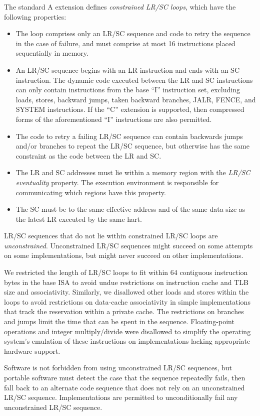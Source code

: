 The standard A extension defines {\em constrained LR/SC loops}, which have
the following properties:
\vspace{-0.2in}
\begin{itemize}
\parskip 0pt
\itemsep 1pt
\item The loop comprises only an LR/SC sequence and code to retry the sequence
  in the case of failure, and must comprise at most 16 instructions placed
  sequentially in memory.
\item An LR/SC sequence begins with an LR instruction and ends with an SC
  instruction.  The dynamic code executed between the LR and SC instructions
  can only contain instructions from the base ``I'' instruction set, excluding
  loads, stores, backward jumps, taken backward branches, JALR, FENCE,
  and SYSTEM instructions.
  If the ``C'' extension is supported, then compressed
  forms of the aforementioned ``I'' instructions are also permitted.
\item The code to retry a failing LR/SC sequence can contain backwards jumps
  and/or branches to repeat the LR/SC sequence, but otherwise has the same
  constraint as the code between the LR and SC.
\item The LR and SC addresses must lie within a memory region with the
  {\em LR/SC eventuality} property.  The execution environment is responsible
  for communicating which regions have this property.
\item The SC must be to the same effective address and of the same data size as
  the latest LR executed by the same hart.
\end{itemize}

LR/SC sequences that do not lie within constrained LR/SC loops are {\em
unconstrained}.  Unconstrained LR/SC sequences might succeed on some attempts
on some implementations, but might never succeed on other implementations.

\begin{commentary}
We restricted the length of LR/SC loops to fit within 64 contiguous
instruction bytes in the base ISA to avoid undue restrictions on instruction
cache and TLB size and associativity.
Similarly, we disallowed other loads and stores within the loops to avoid
restrictions on data-cache associativity in simple implementations that track
the reservation within a private cache.
The restrictions on branches and jumps limit the time that
can be spent in the sequence.  Floating-point operations and integer
multiply/divide were disallowed to simplify the operating system's emulation
of these instructions on implementations lacking appropriate hardware support.

Software is not forbidden from using unconstrained LR/SC sequences, but
portable software must detect the case that the sequence repeatedly fails,
then fall back to an alternate code sequence that does not rely on an
unconstrained LR/SC sequence.  Implementations are permitted to
unconditionally fail any unconstrained LR/SC sequence.
\end{commentary}


